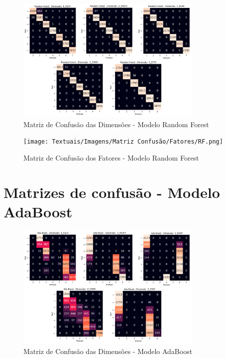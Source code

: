 \begin{apendicesenv}
\begin{figure}[ht]
    \centering
    \includegraphics[width=0.8\textwidth]{Textuais/Imagens/Matriz Confusão/Dimensões/dim_rf.png}
    \caption{Matriz de Confusão das Dimensões - Modelo Random Forest}
    \label{fig:matriz_confusao_dim_rf}
\end{figure}

\begin{figure}[ht]
    \centering
    \texttt{[image: Textuais/Imagens/Matriz Confusão/Fatores/RF.png]}
    \caption{Matriz de Confusão dos Fatores - Modelo Random Forest}
    \label{fig:matriz_confusao_fat_rf}
\end{figure}

                      \chapter{Matrizes de confusão - Modelo AdaBoost}
                      \label{ap3}

\begin{figure}[ht]
    \centering
    \includegraphics[width=0.8\textwidth]{Textuais/Imagens/Matriz Confusão/Dimensões/dim_ab.png}
    \caption{Matriz de Confusão das Dimensões - Modelo AdaBoost}
    \label{fig:matriz_confusao_dim_ab}
\end{figure}


\end{apendicesenv}
